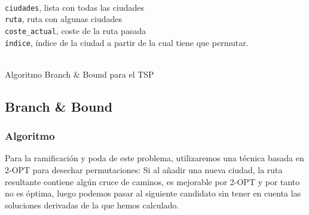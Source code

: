 \documentclass[a4paper, 11pt]{article} %
\begin{document}
  \begin{algorithm}[H]
  	\begin{algorithmic}[1]
  		\REQUIRE \ \\
          \texttt{ciudades}, lista con todas las ciudades \\
          \texttt{ruta}, ruta con algunas ciudades \\
          \texttt{coste\_actual}, coste de la ruta pasada \\
          \texttt{índice}, índice de la ciudad a partir de la cual tiene que permutar. \\\



	      \ENDIF
	    \ELSE
	      \ENDFOR
	    \ENDIF
  	\end{algorithmic}
      \caption{Algoritmo Branch \& Bound para el TSP}
      \label{Back-TSP}
  \end{algorithm}
  
 
  \subsection{Branch \& Bound}
  \subsubsection{Algoritmo}
  
  Para la ramificación y poda de este problema, utilizaremos una técnica basada en 2-OPT para desechar permutaciones: Si al añadir una nueva ciudad, la ruta resultante contiene algún cruce de caminos, es mejorable por 2-OPT y por tanto no es óptima, luego podemos pasar al siguiente candidato sin tener en cuenta las soluciones derivadas de la que hemos calculado.  
  
\end{document}
